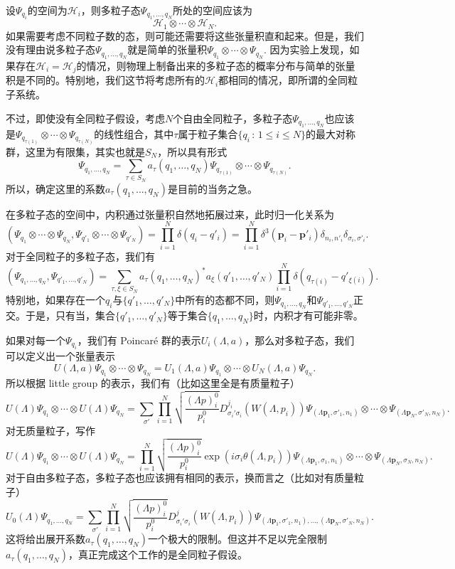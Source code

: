 \documentclass[11pt]{article}
\theoremstyle{definition}
\theoremstyle{plain}
\begin{document}
设$\Psi_{q_i}$的空间为$\mathcal{H}_i$，则多粒子态$\Psi_{q_1,\dots,q_N}$所处的空间应该为
\[
	\mathcal{H}_{1}\otimes\cdots\otimes \mathcal{H}_{N}.
\]
如果需要考虑不同粒子数的态，则可能还需要将这些张量积直和起来。但是，我们没有理由说多粒子态$\Psi_{q_1,\dots,q_N}$就是简单的张量积$\Psi_{q_1}\otimes\cdots\otimes \Psi_{q_N}$. 因为实验上发现，如果存在$\mathcal{H}_i=\mathcal{H}_j$的情况，则物理上制备出来的多粒子态的概率分布与简单的张量积是不同的。特别地，我们这节将考虑所有的$\mathcal{H}_i$都相同的情况，即所谓的全同粒子系统。%

不过，即使没有全同粒子假设，考虑$N$个自由全同粒子，多粒子态$\Psi_{q_1,\dots,q_N}$也应该是$\Psi_{q_{\tau(1)}}\otimes\cdots\otimes \Psi_{q_{\tau(N)}}$的线性组合，其中$\tau$属于粒子集合$\{q_i\,:\,1\leq i \leq N\}$的最大对称群，这里为有限集，其实也就是$S_N$，所以具有形式
\[
	\Psi_{q_1,\dots,q_N}=\sum_{\tau\in S_N}a_\tau(q_1,\dots,q_N)\Psi_{q_{\tau(1)}}\otimes\cdots\otimes \Psi_{q_{\tau(N)}}.
\]
所以，确定这里的系数$a_\tau(q_1,\dots,q_N)$是目前的当务之急。

在多粒子态的空间中，内积通过张量积自然地拓展过来，此时归一化关系为
\[
	(\Psi_{q_1}\otimes\cdots\otimes \Psi_{q_N},\Psi_{q'_1}\otimes\cdots\otimes \Psi_{q'_N})=\prod_{i=1}^N \delta(q_i-q'_i)=\prod_{i=1}^N \delta^3(\bm{p}_i-\bm{p}'_i)\delta_{n_i,n'_i}\delta_{\sigma_i,\sigma'_i}.
\]
对于全同粒子的多粒子态，我们有
\[
	(\Psi_{q_1,\dots,q_N},\Psi_{q'_1,\dots,q'_N})=\sum_{\tau,\xi\in S_N}a_\tau(q_{1},\dots,q_{N})^*a_\xi(q'_{1},\dots,q'_{N})\prod_{i=1}^N \delta(q_{\tau(i)}-q'_{\xi(i)}).
\]
特别地，如果存在一个$q_i$与$\{q'_1,\dots,q'_N\}$中所有的态都不同，则$\Psi_{q_1,\dots,q_N}$和$\Psi_{q'_1,\dots,q'_N}$正交。于是，只有当，集合$\{q'_1,\dots,q'_N\}$等于集合$\{q_1,\dots,q_N\}$时，内积才有可能非零。

如果对每一个$\Psi_{q_i}$，我们有 Poincar\'{e} 群的表示$U_i(\Lambda,a)$，那么对多粒子态，我们可以定义出一个张量表示
\[
	U(\Lambda,a)\Psi_{q_1}\otimes\cdots\otimes \Psi_{q_N}=U_1(\Lambda,a)\Psi_{q_1}\otimes\cdots\otimes U_N(\Lambda,a)\Psi_{q_N}.
\]
所以根据 little group 的表示，我们有（比如这里全是有质量粒子）
\[
	U(\Lambda)\Psi_{q_1}\otimes\cdots\otimes U(\Lambda)\Psi_{q_N}=\sum_{\sigma'}\prod_{i=1}^N \sqrt{\frac{(\Lambda p)^0_i}{p^0_i}}D^{j_i}_{\sigma_i'\sigma_i}(W(\Lambda,p_i))\Psi_{(\Lambda \bm{p}_1,\sigma'_1,n_1)}\otimes \cdots\otimes \Psi_{(\Lambda \bm{p}_N,\sigma'_N,n_N)}.
\]
对无质量粒子，写作
\[
	U(\Lambda)\Psi_{q_1}\otimes\cdots\otimes U(\Lambda)\Psi_{q_N}=\prod_{i=1}^N \sqrt{\frac{(\Lambda p)^0_i}{p^0_i}}\exp(i\sigma_i \theta(\Lambda,p_i))\Psi_{(\Lambda \bm{p}_1,\sigma_1,n_1)}\otimes \cdots\otimes \Psi_{(\Lambda \bm{p}_N,\sigma_N,n_N)}.
\]
对于自由多粒子态，多粒子态也应该拥有相同的表示，换而言之（比如对有质量粒子）
\[
	U_0(\Lambda)\Psi_{q_1,\dots,q_N}=\sum_{\sigma'}\prod_{i=1}^N \sqrt{\frac{(\Lambda p)^0_i}{p^0_i}}D^{j}_{\sigma_i'\sigma_i}(W(\Lambda,p_i))\Psi_{(\Lambda \bm{p}_1,\sigma'_1,n_1),\dots,(\Lambda \bm{p}_N,\sigma'_N,n_N)}.
\]
这将给出展开系数$a_\tau(q_{1},\dots,q_{N})$一个极大的限制。但这并不足以完全限制$a_\tau(q_{1},\dots,q_{N})$，真正完成这个工作的是全同粒子假设。
\end{document}

